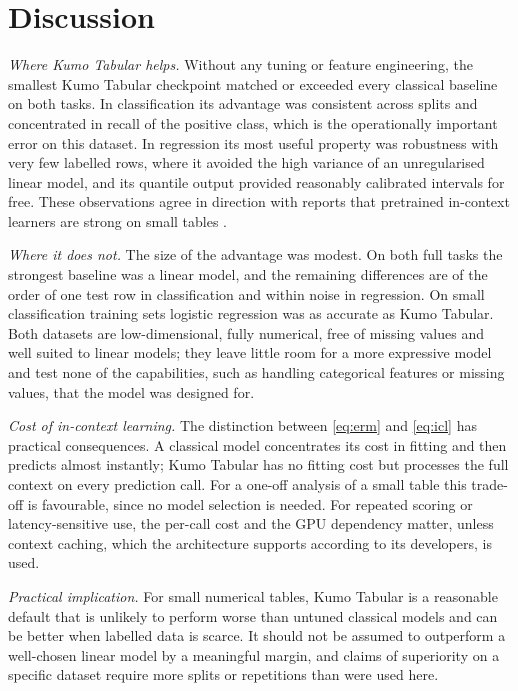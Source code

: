 \documentclass{ieeeaccess}
\begin{document}
\section{Discussion}

\emph{Where Kumo Tabular helps.} Without any tuning or feature engineering, the smallest Kumo Tabular checkpoint matched or exceeded every classical baseline on both tasks. In classification its advantage was consistent across splits and concentrated in recall of the positive class, which is the operationally important error on this dataset. In regression its most useful property was robustness with very few labelled rows, where it avoided the high variance of an unregularised linear model, and its quantile output provided reasonably calibrated intervals for free. These observations agree in direction with reports that pretrained in-context learners are strong on small tables \cite{hollmann2023tabpfn,hollmann2025tabpfn}.

\emph{Where it does not.} The size of the advantage was modest. On both full tasks the strongest baseline was a linear model, and the remaining differences are of the order of one test row in classification and within noise in regression. On small classification training sets logistic regression was as accurate as Kumo Tabular. Both datasets are low-dimensional, fully numerical, free of missing values and well suited to linear models; they leave little room for a more expressive model and test none of the capabilities, such as handling categorical features or missing values, that the model was designed for.

\emph{Cost of in-context learning.} The distinction between \eqref{eq:erm} and \eqref{eq:icl} has practical consequences. A classical model concentrates its cost in fitting and then predicts almost instantly; Kumo Tabular has no fitting cost but processes the full context on every prediction call. For a one-off analysis of a small table this trade-off is favourable, since no model selection is needed. For repeated scoring or latency-sensitive use, the per-call cost and the GPU dependency matter, unless context caching, which the architecture supports according to its developers, is used.

\emph{Practical implication.} For small numerical tables, Kumo Tabular is a reasonable default that is unlikely to perform worse than untuned classical models and can be better when labelled data is scarce. It should not be assumed to outperform a well-chosen linear model by a meaningful margin, and claims of superiority on a specific dataset require more splits or repetitions than were used here.
\end{document}
